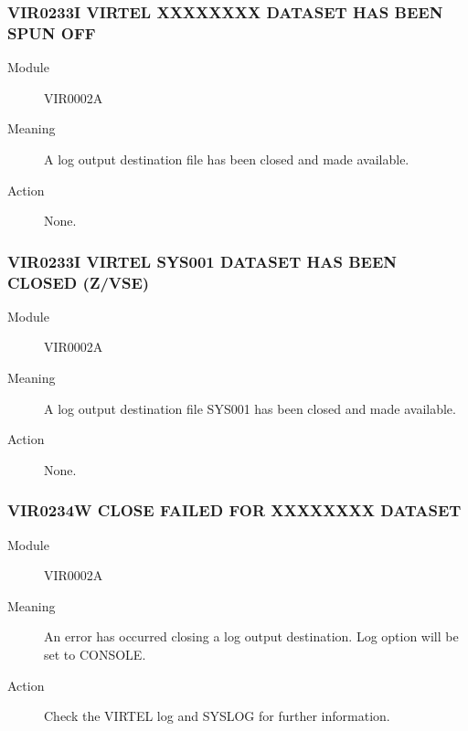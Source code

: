 \documentclass[letterpaper,10pt,english]{sphinxmanual}
\begin{document}
\subsubsection{VIR0233I VIRTEL XXXXXXXX DATASET HAS BEEN SPUN OFF}
\label{\detokenize{messages:vir0233i-virtel-xxxxxxxx-dataset-has-been-spun-off}}\begin{description}
\item[{Module}] \leavevmode
VIR0002A

\item[{Meaning}] \leavevmode
A log output destination file has been closed and made available.

\item[{Action}] \leavevmode
None.

\end{description}


\subsubsection{VIR0233I VIRTEL SYS001 DATASET HAS BEEN CLOSED (Z/VSE)}
\label{\detokenize{messages:vir0233i-virtel-sys001-dataset-has-been-closed-z-vse}}\begin{description}
\item[{Module}] \leavevmode
VIR0002A

\item[{Meaning}] \leavevmode
A log output destination file SYS001 has been closed and made available.

\item[{Action}] \leavevmode
None.

\end{description}


\subsubsection{VIR0234W CLOSE FAILED FOR XXXXXXXX DATASET}
\label{\detokenize{messages:vir0234w-close-failed-for-xxxxxxxx-dataset}}\begin{description}
\item[{Module}] \leavevmode
VIR0002A

\item[{Meaning}] \leavevmode
An error has occurred closing a log output destination. Log option will be set to CONSOLE.

\item[{Action}] \leavevmode
Check the VIRTEL log and SYSLOG for further information.

\end{description}
\end{document}
